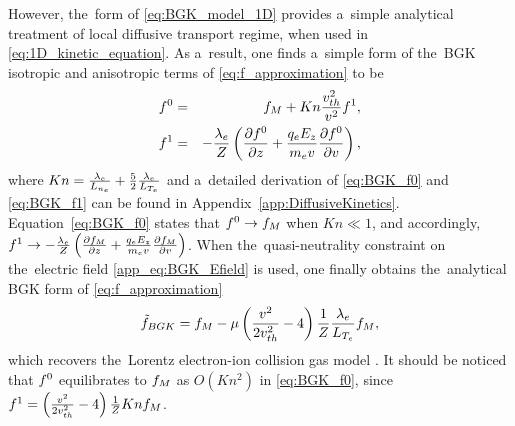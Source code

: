 However, the~form of \eqref{eq:BGK_model_1D} provides a~simple analytical 
treatment of local diffusive transport regime, when used in 
\eqref{eq:1D_kinetic_equation}. As a~result, one finds a~simple form of
the~BGK isotropic and anisotropic terms of \eqref{eq:f_approximation} to be
\begin{eqnarray}
  f^0 &=& f_M + Kn \frac{v_{th}^2}{v^2}f^1 ,
  \label{eq:BGK_f0} \\
  f^1 &=& - \frac{\lambda_e}{Z}
  \left( \frac{\partial{f^0}}{\partial{z}} + \frac{q_eE_z}{m_ev}\frac{\partial{f^0}}{\partial{v}} \right) , 
  \label{eq:BGK_f1}
\end{eqnarray}
where 
$Kn = \frac{\lambda_e}{L_{n_e}} + \frac{5}{2}\frac{\lambda_e}{L_{T_e}}$
and a~detailed derivation of \eqref{eq:BGK_f0} and \eqref{eq:BGK_f1} 
can be found in Appendix~\ref{app:DiffusiveKinetics}.
Equation~\eqref{eq:BGK_f0} states that $f^0\rightarrow f_M$ when $Kn\ll1$, and 
accordingly, $f^1 \rightarrow - \frac{\lambda_e}{Z}
\left( \frac{\partial{f_M}}{\partial{z}} + \frac{q_eE_z}{m_ev}\frac{\partial{f_M}}{\partial{v}} \right)$.
When the~quasi-neutrality constraint on the~electric field 
\eqref{app_eq:BGK_Efield} is used, one finally obtains the~analytical BGK form 
of \eqref{eq:f_approximation}
\begin{equation}
  \tilde{f}_{BGK} = f_M - \mu 
  \left( \frac{v^2}{2 v_{th}^2} - 4\right)\frac{1}{Z}
  \frac{\lambda_e}{L_{T_e}}f_M , 
  \label{eq:BGK_approximation}
\end{equation}
which recovers the~Lorentz electron-ion collision gas model 
\cite{Lorentz_1905}. It should be noticed that $f^0$ equilibrates to $f_M$ 
as $O(Kn^2)$ in \eqref{eq:BGK_f0}, since 
$f^1 = \left( \frac{v^2}{2 v_{th}^2} - 4\right)\frac{1}{Z}
Kn f_M$.

